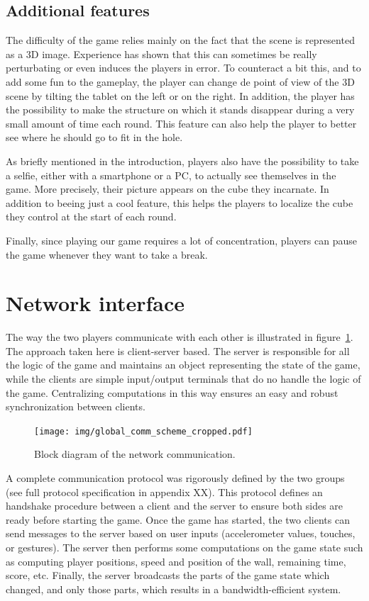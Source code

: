 \documentclass[english, DIV=13]{scrartcl}
\begin{document}
\subsection{Additional features}
The difficulty of the game relies mainly on the fact that the scene is represented as a
3D image. Experience has shown that this can sometimes be really perturbating or even
induces the players in error. To counteract a bit this, and to add some fun to the
gameplay, the player can change de point of view of the 3D scene by tilting the tablet
on the left or on the right. In addition, the player has the possibility to make the
structure on which it stands disappear during a very small amount of time each round.
This feature can also help the player to better see where he should go to fit in the hole.

As briefly mentioned in the introduction, players also have the possibility to take a
selfie, either with a smartphone or a PC, to actually see themselves in the game. More
precisely, their picture appears on the cube they incarnate. In addition to beeing just a
cool feature, this helps the players to localize the cube they control at the start of
each round.

Finally, since playing our game requires a lot of concentration, players can pause the
game whenever they want to take a break.

\section{Network interface}
\label{sec:net-interface}

The way the two players communicate with each other is illustrated in
figure~\ref{fig:comm-scheme}.
The approach taken here is client-server based. The server is responsible
for all the logic of the game and maintains an object representing the state of the game,
while the clients are simple input/output terminals that do no handle the logic of the game.
Centralizing computations in this way ensures an easy and robust synchronization between
clients.

\begin{figure}
    \centering
    \texttt{[image: img/global\_comm\_scheme\_cropped.pdf]}
    \caption{Block diagram of the network communication.}
    \label{fig:comm-scheme}
\end{figure}

A complete communication protocol was rigorously defined by the two groups (see full
protocol specification in appendix XX).
This protocol defines an handshake procedure between a client and the server to ensure both
sides are ready before starting the game.
Once the game has started, the two clients can send
messages to the server based on user inputs (accelerometer values, touches, or gestures).
The server then performs some computations on the game state such as computing player
positions, speed and position of the wall, remaining time, score, etc. Finally, the server
broadcasts the parts of the game state which changed, and only those parts, which results
in a bandwidth-efficient system.
\end{document}
